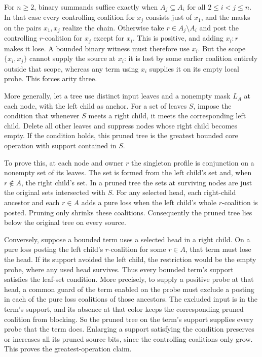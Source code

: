 For $n\geq2$, binary summands suffice exactly when
$A_j\subseteq A_i$ for all $2\leq i<j\leq n$. In that
case every controlling coalition for $x_j$ consists just
of $x_1$, and the masks on the pairs $x_1,x_j$ realize
the chain. Otherwise take $r\in A_j\setminus A_i$ and
post the controlling $r$-coalition for $x_j$ except for
$x_i$. This is positive, and adding $x_i:r$ makes it
lose. A bounded binary witness must therefore use $x_i$.
But the scope $\{x_i,x_j\}$ cannot supply the source at
$x_i$: it is lost by some earlier coalition entirely
outside that scope, whereas any term using $x_i$ supplies
it on its empty local probe. This forces arity three.

More generally, let a tree use distinct input leaves and a
nonempty mask $L_A$ at each node, with the left child as
anchor. For a set of leaves $S$, impose the condition that
whenever $S$ meets a right child, it meets the corresponding
left child. Delete all other leaves and suppress nodes whose
right child becomes empty. If the condition holds, this
pruned tree is the greatest bounded core operation with
support contained in $S$.

To prove this, at each node and owner $r$ the singleton
profile is conjunction on a nonempty set of its leaves.
The set is formed from the left child's set and, when
$r\notin A$, the right child's set. In a pruned tree the
sets at surviving nodes are just the original sets
intersected with $S$. For any selected head, each right-child
ancestor and each $r\in A$ adds a pure loss when the left
child's whole $r$-coalition is posted. Pruning only shrinks
these coalitions. Consequently the pruned tree lies below
the original tree on every source.

Conversely, suppose a bounded term uses a selected head
in a right child. On a pure loss posting the left child's
$r$-coalition for some $r\in A$, that term must lose the
head. If its support avoided the left child, the restriction
would be the empty probe, where any used head survives.
Thus every bounded term's support satisfies the leaf-set
condition. More precisely, to supply a positive probe at
that head, a common guard of the term enabled on the probe
must exclude a posting in each of the pure loss coalitions
of those ancestors. The excluded input is in the term's
support, and its absence at that color keeps the corresponding
pruned coalition from blocking. So the pruned tree on the
term's support supplies every probe that the term does.
Enlarging a support satisfying the condition preserves or
increases all its pruned source bits, since the controlling
coalitions only grow. This proves the greatest-operation claim.

